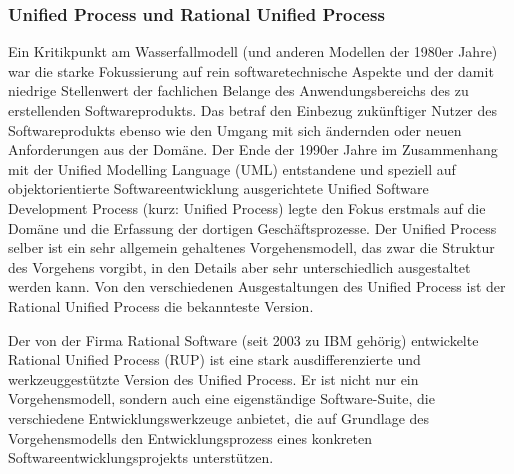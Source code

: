 \clearpage %

\subsubsection{Unified Process und Rational Unified Process}
\label{sec:Kap-2.2.2.1}

\vspace{\baselineskip} %


Ein  Kritikpunkt am Wasserfallmodell (und anderen Modellen der 1980er Jahre) war die starke Fokussierung auf rein softwaretechnische Aspekte und der damit niedrige Stellenwert der fachlichen Belange des Anwendungsbereichs des zu erstellenden Softwareprodukts. Das betraf den Einbezug zukünftiger Nutzer des Softwareprodukts ebenso wie den Umgang mit sich ändernden oder neuen Anforderungen aus der Domäne. Der Ende der 1990er Jahre im Zusammenhang mit der Unified Modelling Language (UML) entstandene und speziell auf objektorientierte Softwareentwicklung ausgerichtete Unified Software Development Process (kurz: Unified Process) \cite{jac99} legte den Fokus erstmals auf die Domäne und die Erfassung der dortigen Geschäftsprozesse. Der Unified Process selber ist ein sehr allgemein gehaltenes Vorgehensmodell, das zwar die Struktur des Vorgehens vorgibt, in den Details aber sehr unterschiedlich ausgestaltet werden kann. Von den verschiedenen Ausgestaltungen des Unified Process ist der Rational Unified Process die bekannteste Version.

Der von der Firma Rational Software (seit 2003 zu IBM gehörig) entwickelte Rational Unified Process (RUP) ist eine stark ausdifferenzierte und werkzeuggestützte Version des Unified Process. Er ist nicht nur ein Vorgehensmodell, sondern auch eine eigenständige Software-Suite, die verschiedene Entwicklungswerkzeuge anbietet, die auf Grundlage des Vorgehensmodells den Entwicklungsprozess eines konkreten Softwareentwicklungsprojekts unterstützen. 


